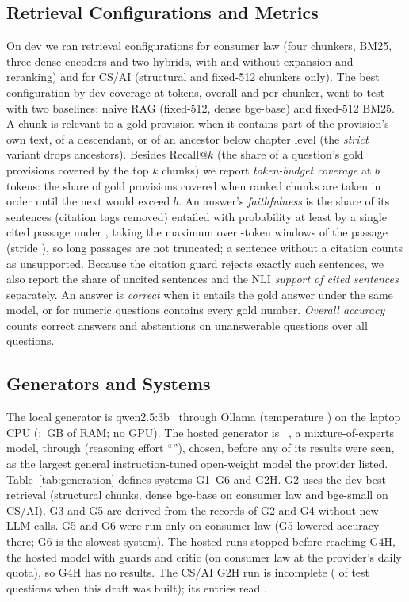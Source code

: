 \subsection{Retrieval Configurations and Metrics}
On dev we ran  retrieval configurations for consumer law (four chunkers, BM25, three dense encoders and two hybrids, with and without expansion and reranking) and  for CS/AI (structural and fixed-512 chunkers only).
The best configuration by dev coverage at  tokens, overall and per chunker, went to test with two baselines: naive RAG (fixed-512, dense bge-base) and fixed-512 BM25.
A chunk is relevant to a gold provision when it contains part of the provision's own text, of a descendant, or of an ancestor below chapter level (the \emph{strict} variant drops ancestors).
Besides Recall@$k$ (the share of a question's gold provisions covered by the top $k$ chunks) we report \emph{token-budget coverage} at $b$ tokens: the share of gold provisions covered when ranked chunks are taken in order until the next would exceed $b$.
An answer's \emph{faithfulness} is the share of its sentences (citation tags removed) entailed with probability at least  by a single cited passage under , taking the maximum over -token windows of the passage (stride ), so long passages are not truncated; a sentence without a citation counts as unsupported. Because the citation guard rejects exactly such sentences, we also report the share of uncited sentences and the NLI \emph{support of cited sentences} separately.
An answer is \emph{correct} when it entails the gold answer under the same model, or for numeric questions contains every gold number.
\emph{Overall accuracy} counts correct answers and abstentions on unanswerable questions over all questions.

\subsection{Generators and Systems}
The local generator is qwen2.5:3b~\cite{qwen2024qwen25} through Ollama (temperature ) on the laptop CPU (; \,GB of RAM; no GPU).
The hosted generator is \gptoss{}~\cite{openai2025gptoss}, a mixture-of-experts model, through  (reasoning effort ``''), chosen, before any of its results were seen, as the largest general instruction-tuned open-weight model the provider listed.
Table~\ref{tab:generation} defines systems G1--G6 and G2H. G2 uses the dev-best retrieval (structural chunks, dense bge-base on consumer law and bge-small on CS/AI). G3 and G5 are derived from the records of G2 and G4 without new LLM calls.
G5 and G6 were run only on consumer law (G5 lowered accuracy there; G6 is the slowest system). The hosted runs stopped before reaching G4H, the hosted model with guards and critic (on consumer law at the provider's daily quota), so G4H has no results.
\ifcsGtwoHready\else The CS/AI G2H run is incomplete ( of  test questions when this draft was built); its entries read \pend{}.\fi

